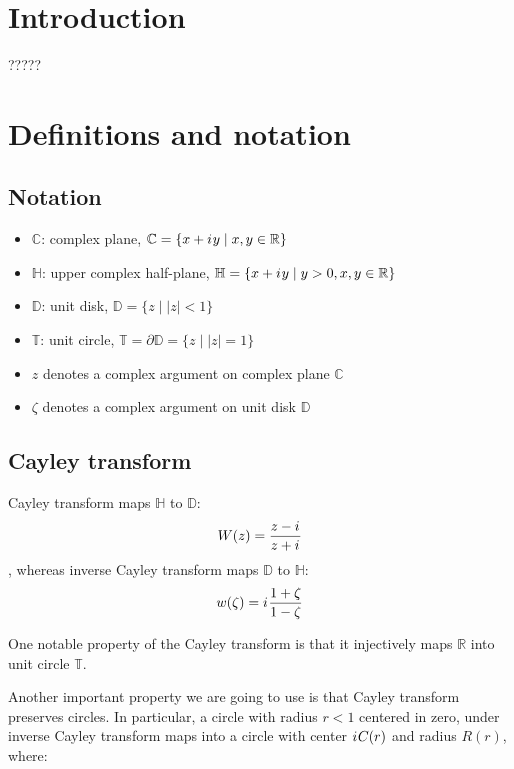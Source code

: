 \documentclass{gCOV2e}
\theoremstyle{plain}%
\theoremstyle{definition}
\theoremstyle{remark}
\newcommand{\iu}{{i\mkern1mu}} %
\newcommand\abs[1]{\left|#1\right|}
\begin{document}
\section{Introduction}

????? 

\section{Definitions and notation}

\subsection{Notation}

\begin{itemize}
\item $\mathbb{C}$: complex plane, $\mathbb{C} = \{ x + \iu y \mid x, y \in \mathbb{R} \}$ 
\item $\mathbb{H}$: upper complex half-plane, $\mathbb{H} = \{ x + \iu y \mid y > 0, x, y \in \mathbb{R} \}$
\item $\mathbb{D}$: unit disk, $\mathbb{D} = \{ z \mid \abs{z} < 1 \}$
\item $\mathbb{T}$: unit circle, $\mathbb{T} = \partial \mathbb{D} =  \{z \mid \abs{z} = 1 \}$
\item $z$ denotes a complex argument on complex plane $\mathbb{C}$
\item $\zeta$ denotes a complex argument on unit disk $\mathbb{D}$
\end{itemize}

\subsection{Cayley transform}

Cayley transform maps $\mathbb{H}$ to $\mathbb{D}$:
\begin{equation}\label{eq:cayley}
W(z) = \frac{z - \iu}{z + \iu}
\end{equation}
, whereas inverse Cayley transform maps $\mathbb{D}$ to $\mathbb{H}$:
\begin{equation}\label{eq:cayley_inverse}
w(\zeta) = \iu \frac{1 + \zeta}{1 - \zeta}
\end{equation}

One notable property of the Cayley transform is that it injectively maps $\mathbb{R}$ into unit circle $\mathbb{T}$.

Another important property we are going to use is that Cayley transform preserves circles. In particular, a circle with radius $r < 1$ centered in zero, under inverse Cayley transform maps into a circle with center $\iu C(r)$ and radius $R(r)$, where:
\end{document}
